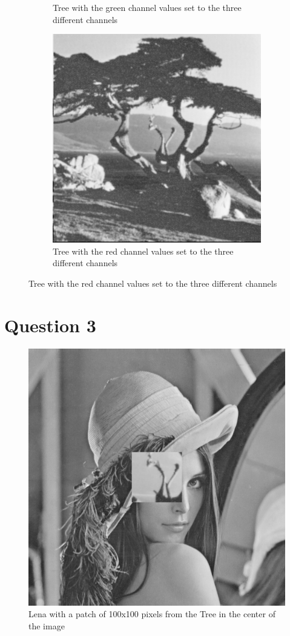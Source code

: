 \documentclass[a4paper,11pt]{article}
\begin{document}
\begin{figure}[h!]
\begin{center}
\begin{subfigure}[t]{0.3\textwidth}
      \caption{Tree with the green channel values set to the three different channels}
      \label{q2b}
    \end{subfigure}
    \begin{subfigure}[t]{0.3\textwidth}
      \centering
      \includegraphics[width=0.9\linewidth]{Images/ps0-2-c.png}
      \caption{Tree with the red channel values set to the three different channels}
      \label{q2c}
    \end{subfigure}
  \end{center}
\end{figure}

\section{Question 3}

\begin{figure}[h!]
  \centering
  \includegraphics[width=0.5\linewidth]{Images/ps0-3.png}
  \caption{Lena with a patch of 100x100 pixels from the Tree in the center of the image}
  \label{q3}
\end{figure}
\end{document}

